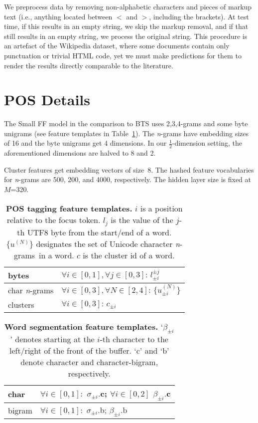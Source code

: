 \documentclass[11pt,letterpaper]{article}
\newcommand{\kgrams}[1]{{\it #1}-grams}
\newcommand{\ngrams}{\kgrams{n}}
\begin{document}
We preprocess data by removing non-alphabetic characters and pieces of markup text (i.e., anything located between $<$ and $>$, including the brackets).
At test time, if this results in an empty string, we skip the markup removal, and if that still results in an empty string, we process the original string.
This procedure is an artefact of the Wikipedia dataset, where some documents contain only punctuation or trivial HTML code, yet we must make predictions for them to render the results directly comparable to the literature.


\section{POS Details}
The Small FF model in the comparison to BTS uses 2,3,4-grams and some byte unigrams (see feature templates in Table~\ref{tab:pos-features}).
The \ngrams{} have embedding sizes of 16 and the byte unigrams get 4 dimensions. In our $\frac{1}{2}$-dimension setting, the aforementioned dimensions are halved to 8 and 2.

Cluster features get embedding vectors of size~8.
The hashed feature vocabularies for \ngrams{} are 500, 200, and 4000, respectively.
The hidden layer size is fixed at $M$=320.

\begin{table}[htbp]
  \begin{tabular}{l|l}
    bytes & $\forall i \in [0,1], \forall j \in [0,3]: \, l_{\pm i}^{\pm j}$ \\ \hline
    char \ngrams & $\forall i \in [0,3], \forall N \in [2,4]: \, \{u_{\pm i}^{(N)}\}$ \\ \hline
    clusters & $\forall i \in [0,3]: \, c_{\pm i}$ \\
  \end{tabular}
  \caption{{\bf POS tagging feature templates.} $i$ is a position relative to the focus token. $l_j$ is the value of the $j$-th UTF8 byte from the start/end of a word. $\{u^{(N)}\}$ designates the set of Unicode character \ngrams \ in a word. $c$ is the cluster id of a word.}
  \label{tab:pos-features}
\end{table}

\begin{table}[htbp]
\begin{tabular}{l|l}
\hline
  char & $\forall i \in [0, 1]:$ $\sigma_{\pm i}.$c; \hspace{0.15cm} $\forall i \in [0, 2]$ $\beta_{\pm i}.$c \\ \hline
  bigram & $\forall i \in [0, 1]:$ $\sigma_{\pm i}.$b; \hspace{0.15cm} $\beta_{\pm i}.$b \\\hline

\end{tabular}
  \caption{{\bf Word segmentation feature templates.} `$\beta_{\pm i}$' denotes starting at the $i$-th character to the left/right of the front of the buffer.  `c' and `b' denote character and character-bigram, respectively.}
\label{tab:seg-feature}
\end{table}
\end{document}
